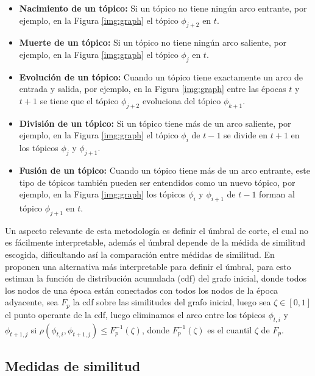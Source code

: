 \documentclass[letterpaper,12pt,oneside]{book} %
\begin{document}
\begin{itemize}
    \item \textbf{Nacimiento de un tópico:} Si un tópico no tiene ningún arco entrante, por ejemplo, en la Figura \ref{img:graph} el tópico $\phi_{j+2}$ en $t$.
    \item \textbf{Muerte de un tópico:} Si un tópico no tiene ningún arco saliente, por ejemplo, en la Figura \ref{img:graph} el tópico $\phi_{j}$ en $t$.
    \item \textbf{Evolución de un tópico:} Cuando un tópico tiene exactamente un arco de entrada y salida, por ejemplo, en la Figura \ref{img:graph} entre las épocas $t$ y $t+1$ se tiene que el tópico $\phi_{j+2}$ evoluciona del tópico $\phi_{k+1}$.
    \item \textbf{División de un tópico:} Si un tópico tiene más de un arco saliente, por ejemplo, en la Figura \ref{img:graph} el tópico $\phi_{i}$ de $t-1$ se divide en $t+1$ en los tópicos $\phi_{j}$ y $\phi_{j+1}$.
    \item \textbf{Fusión de un tópico:} Cuando un tópico tiene más de un arco entrante, este tipo de tópicos también pueden ser entendidos como un nuevo tópico, por ejemplo, en la Figura \ref{img:graph} los tópicos $\phi_{i}$ y $\phi_{i+1}$ de $t-1$ forman al tópico $\phi_{j+1}$ en $t$.
\end{itemize}

Un aspecto relevante de esta metodología es definir el úmbral de corte, el cual no es fácilmente interpretable, además el úmbral depende de la médida de similitud escogida, dificultando así la comparación entre médidas de similitud. En \cite{beykikhoshk2018discovering} proponen una alternativa más interpretable para definir el úmbral, para esto estiman la función de distribución acumulada (cdf) del grafo inicial, donde todos los nodos de una época están conectados con todos los nodos de la época adyacente, sea $F_{p}$ la cdf sobre las similitudes del grafo inicial, luego sea $\zeta \in [0,1]$ el punto operante de la cdf, luego eliminamos el arco entre los tópicos $\phi_{t,i}$ y $\phi_{t+1,j}$ si $\rho(\phi_{t,i}, \phi_{t+1,j})\leq F_{p}^{-1}(\zeta)$, donde  $F_{p}^{-1}(\zeta)$ es el cuantil $\zeta$ de $F_{p}$.

\subsection{Medidas de similitud}
\end{document}
